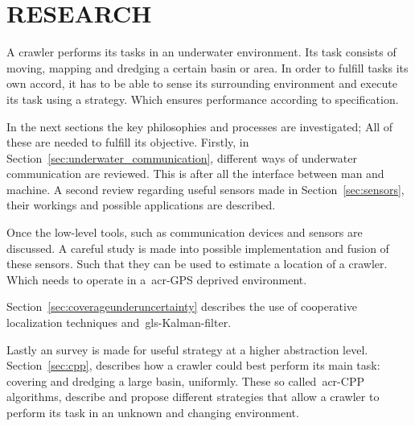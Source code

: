 

\chapter{RESEARCH}\label{chap:research}
A crawler performs its tasks in an underwater environment. Its task consists of moving, mapping and dredging a 
certain basin or area. In order to fulfill tasks its own accord, it has to be able to sense its surrounding 
environment and execute its task using a strategy. Which ensures performance according to specification.

In the next sections the key philosophies and processes are investigated; All of these are needed to fulfill its 
objective. Firstly, in Section~\ref{sec:underwater_communication}, different ways of underwater communication are 
reviewed. This is after all the interface between man and machine. A second review regarding useful sensors made in 
Section~\ref{sec:sensors}, their workings and possible applications are described.

Once the low-level tools, such as communication devices and sensors are discussed. A careful study is made into 
possible implementation and fusion of these sensors. Such that they can be used to estimate a location of a crawler. 
Which needs to operate in a~\gls{acr-GPS} deprived environment.

Section~\ref{sec:coverageunderuncertainty} describes the use of cooperative localization techniques 
and~\gls{gls-Kalman-filter}.

Lastly an survey is made for useful strategy at a higher abstraction level. Section~\ref{sec:cpp}, describes how a 
crawler could best perform its main task: covering and dredging a large basin, uniformly. These so 
called~\gls{acr-CPP} algorithms, describe and propose different strategies that allow a crawler to perform its task 
in an unknown and changing environment.
